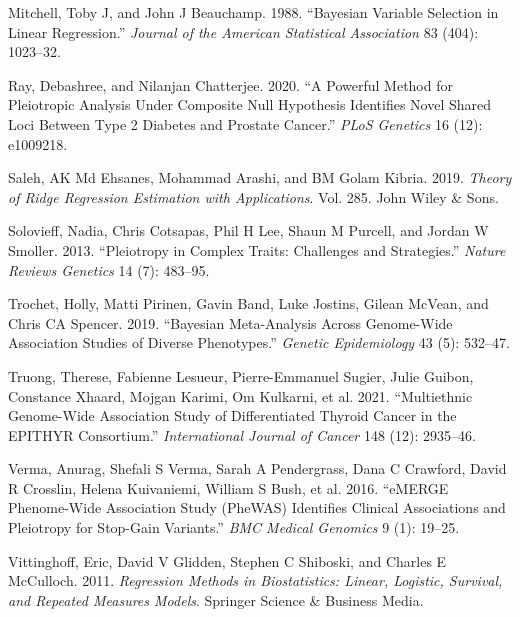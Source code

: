 \begin{CSLReferences}{1}{0}
\leavevmode{}%
Mitchell, Toby J, and John J Beauchamp. 1988. {``Bayesian Variable Selection in Linear Regression.''} \emph{Journal of the American Statistical Association} 83 (404): 1023--32.

\leavevmode{}%
Ray, Debashree, and Nilanjan Chatterjee. 2020. {``A Powerful Method for Pleiotropic Analysis Under Composite Null Hypothesis Identifies Novel Shared Loci Between Type 2 Diabetes and Prostate Cancer.''} \emph{PLoS Genetics} 16 (12): e1009218.

\leavevmode{}%
Saleh, AK Md Ehsanes, Mohammad Arashi, and BM Golam Kibria. 2019. \emph{Theory of Ridge Regression Estimation with Applications}. Vol. 285. John Wiley \& Sons.

\leavevmode{}%
Solovieff, Nadia, Chris Cotsapas, Phil H Lee, Shaun M Purcell, and Jordan W Smoller. 2013. {``Pleiotropy in Complex Traits: Challenges and Strategies.''} \emph{Nature Reviews Genetics} 14 (7): 483--95.

\leavevmode{}%
Trochet, Holly, Matti Pirinen, Gavin Band, Luke Jostins, Gilean McVean, and Chris CA Spencer. 2019. {``Bayesian Meta-Analysis Across Genome-Wide Association Studies of Diverse Phenotypes.''} \emph{Genetic Epidemiology} 43 (5): 532--47.

\leavevmode{}%
Truong, Therese, Fabienne Lesueur, Pierre-Emmanuel Sugier, Julie Guibon, Constance Xhaard, Mojgan Karimi, Om Kulkarni, et al. 2021. {``Multiethnic Genome-Wide Association Study of Differentiated Thyroid Cancer in the EPITHYR Consortium.''} \emph{International Journal of Cancer} 148 (12): 2935--46.

\leavevmode{}%
Verma, Anurag, Shefali S Verma, Sarah A Pendergrass, Dana C Crawford, David R Crosslin, Helena Kuivaniemi, William S Bush, et al. 2016. {``eMERGE Phenome-Wide Association Study (PheWAS) Identifies Clinical Associations and Pleiotropy for Stop-Gain Variants.''} \emph{BMC Medical Genomics} 9 (1): 19--25.

\leavevmode{}%
Vittinghoff, Eric, David V Glidden, Stephen C Shiboski, and Charles E McCulloch. 2011. \emph{Regression Methods in Biostatistics: Linear, Logistic, Survival, and Repeated Measures Models}. Springer Science \& Business Media.


\end{CSLReferences}

